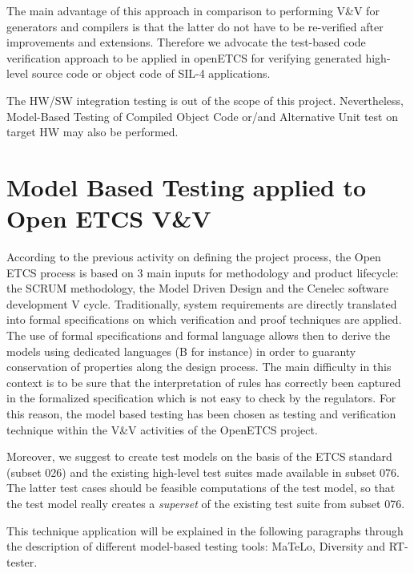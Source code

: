 The  main advantage of this approach in comparison to performing V\&V for
generators and compilers is that the latter do not have to be
re-verified after improvements and extensions. Therefore we advocate
the test-based code verification approach to be applied in openETCS
for verifying generated high-level source code or object code of SIL-4
applications. 


The HW/SW integration testing is out of the scope of this
project. Nevertheless, Model-Based Testing of Compiled Object Code
or/and  Alternative Unit test on target HW may also be performed.


\section{Model Based Testing applied to Open ETCS V\&V}
According to the previous activity on defining the project process,
the Open ETCS process is based on 3 main inputs for methodology and
product lifecycle: the SCRUM methodology, the Model Driven Design and
the Cenelec software development V cycle.  Traditionally, system
requirements are directly translated into formal specifications on
which verification and proof techniques are applied. The use of formal
specifications and formal language allows then to derive the models
using dedicated languages (B for instance) in order to guaranty
conservation of properties along the design process. The main
difficulty in this context is to be sure that the interpretation of
rules has correctly been captured in the formalized specification
which is not easy to check by the regulators. For this reason, the
model based testing has been chosen as testing and verification
technique within the V\&V activities of the OpenETCS project.

Moreover, we suggest to create test models on the basis of the ETCS
standard (subset 026) and the existing high-level test suites made
available in subset 076. The latter test cases should be feasible
computations of the test model, so that the test model really creates
a {\it superset} of the existing test suite from subset 076.

This technique application will be explained in the following
paragraphs through the description of different model-based testing
tools: MaTeLo, Diversity and RT-tester.

